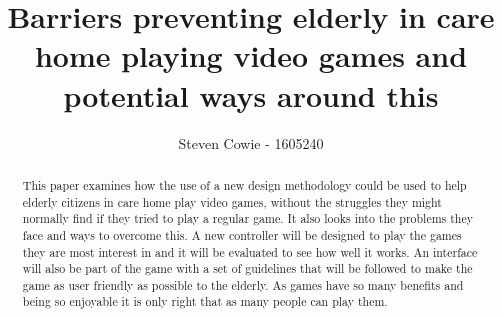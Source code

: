 \documentclass[journal]{IEEEtran}
\begin{document}
%
\title{Barriers preventing elderly in care home playing video games and potential ways around this}
%
%
\author{Steven Cowie - 1605240 }


\maketitle

\begin{abstract}
This paper examines how the use of a new design methodology could be used to help elderly citizens in care home play video games, without the struggles they might normally find if they tried to play a regular game. It also looks into the problems they face and ways to overcome this. A new controller will be designed to play the games they are most interest in and it will be evaluated to see how well it works. An interface will also be part of the game with a set of guidelines that will be followed to make the game as user friendly as possible to the elderly. As games have so many benefits and being so enjoyable it is only right that as many people can play them.
\end{abstract}
\end{document}
